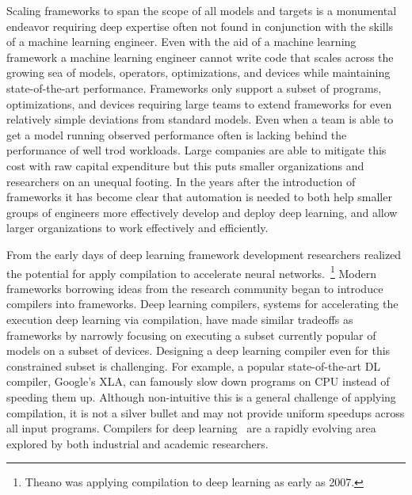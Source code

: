 Scaling frameworks to span the scope of all models and targets is a monumental endeavor
  requiring deep expertise often not found in conjunction with the skills of a
  machine learning engineer.
Even with the aid of a machine learning framework a machine learning engineer
  cannot write code that scales across the growing sea of
  models, operators, optimizations, and devices while maintaining state-of-the-art performance.
Frameworks only support a subset of programs, optimizations, and devices
  requiring large teams to extend frameworks for even relatively simple deviations
  from standard models.
Even when a team is able to get a model running observed performance often
  is lacking behind the performance of well trod workloads.
Large companies are able to mitigate this cost with raw capital expenditure
  but this puts smaller organizations and researchers on an unequal footing.
In the years after the introduction of frameworks it has become clear
  that automation is needed to both help smaller groups of engineers
  more effectively develop and deploy deep learning, and allow larger
  organizations to work effectively and efficiently.

From the early days of deep learning framework development researchers realized the
  potential for apply compilation to accelerate neural networks.~\footnote{Theano was applying
  compilation to deep learning as early as 2007.}
Modern frameworks borrowing ideas from the research community
  began to introduce compilers into frameworks.
Deep learning compilers, systems for accelerating the execution deep learning via compilation,
 have made similar tradeoffs as frameworks by narrowly focusing on executing a subset
 currently popular of models on a subset of devices.
Designing a deep learning compiler even for this constrained subset is challenging.
For example,
  a popular state-of-the-art DL compiler,
  Google's XLA, can famously slow down programs on
  CPU instead of speeding them up.
Although non-intuitive this is a general challenge of applying compilation,
  it is not a silver bullet and may not provide uniform speedups across all input programs.
Compilers for deep learning~\citep{xla,jax,glow,tvm_osdi18,myia,fluxjl,lattner2020mlir} are
  a rapidly evolving area explored by both industrial and academic researchers.

